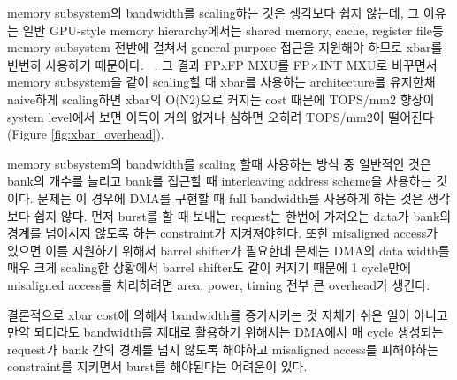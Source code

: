 \documentclass[11pt]{article}
\newcommand{\todo}[1]{\textcolor{red}{[TODO: #1]}}
\newcommand{\fpint}{FP$\times$INT}
\begin{document}
memory subsystem의 bandwidth를 scaling하는 것은 생각보다 쉽지 않는데, 그 이유는 일반 GPU-style memory hierarchy에서는 shared memory, cache, register file등 memory subsystem 전반에 걸쳐서 general-purpose 접근을 지원해야 하므로 xbar를 빈번히 사용하기 때문이다. ~\cite{jin2024uncovering, tine2021vortex}.
그 결과 FPxFP MXU를 \fpint{} MXU로 바꾸면서 memory subsystem을 같이 scaling할 때 xbar를 사용하는 architecture를 유지한채 naive하게 scaling하면 xbar의 O(N2)으로 커지는 cost 때문에 TOPS/mm2 향상이 system level에서 보면 이득이 거의 없거나 심하면 오히려 TOPS/mm2이 떨어진다 (Figure \ref{fig:xbar_overhead}).

memory subsystem의 bandwidth를 scaling 할때 사용하는 방식 중 일반적인 것은 bank의 개수를 늘리고 bank를 접근할 때 interleaving address scheme을 사용하는 것이다. 문제는 이 경우에 DMA를 구현할 때 full bandwidth를 사용하게 하는 것은 생각보다 쉽지 않다. 먼저 burst를 할 때 보내는 request는 한번에 가져오는 data가 bank의 경계를 넘어서지 않도록 하는 constraint가 지켜져야한다. 또한 misaligned access가 있으면 이를 지원하기 위해서 barrel shifter가 필요한데 문제는 DMA의 data width를 매우 크게 scaling한 상황에서 barrel shifter도 같이 커지기 때문에 1 cycle만에 misaligned access를 처리하려면 area, power, timing 전부 큰 overhead가 생긴다. %

결론적으로 xbar cost에 의해서 bandwidth를 증가시키는 것 자체가 쉬운 일이 아니고 만약 되더라도 bandwidth를 제대로 활용하기 위해서는 DMA에서 매 cycle 생성되는 request가 bank 간의 경계를 넘지 않도록 해야하고 misaligned access를 피해야하는 constraint를 지키면서 burst를 해야된다는 어려움이 있다.
\end{document}
